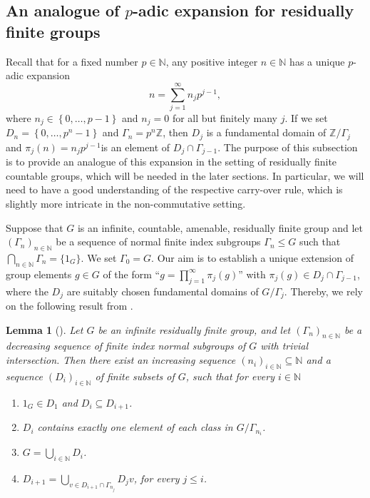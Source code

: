 \documentclass[titlepage,reqno,10pt]{amsart}
\newtheorem{lemma}[theorem]{Lemma}
\theoremstyle{definition}
\def\Z{{\mathbb Z}}
\def\N{{\mathbb N}}
\newcommand{\set}[1]{\left\{ #1 \right\}}
\begin{document}
\subsection{An analogue of $p$-adic expansion for residually finite groups} \label{subsect: expansion}
Recall that for a fixed number $p\in\N$, any positive integer $n\in\N$ has a unique $p$-adic expansion 
\begin{equation}\label{e.p-adic_expansion}
n = \sum_{j=1}^\infty n_jp^{j-1},
\end{equation} where $n_j \in \set{0,\ldots,p-1}$ and $n_j=0$ for all but finitely many $j$. If we set $D_n = \set{0,\ldots, p^n-1}$ and $\Gamma_n = p^n\Z$, then $D_j$ is a fundamental domain of $\Z/\Gamma_j$ and $\pi_j(n)=n_jp^{j-1}$is an element of $D_j \cap \Gamma_{j-1}$. The purpose of this subsection is to provide an analogue of this expansion in the setting of residually finite countable groups, which will be needed in the later sections. 
In particular, we will need to have a good understanding of the respective carry-over rule, which is slightly more intricate in the non-commutative setting. 
\medskip 

Suppose that $G$ is an infinite, countable, amenable, residually finite group and let $(\Gamma_n)_{n\in\N}$ be a sequence of normal finite index subgroups $\Gamma_n\leq G$ such that $\bigcap_{n\in\N} \Gamma_n = \{1_G\}$.
We set $\Gamma_0=G$. Our aim is to establish a unique extension of group elements $g\in G$ of the form  ``$g = \prod_{j=1}^\infty \pi_j(g)$'' with $\pi_j(g) \in D_j \cap \Gamma_{j-1}$, where the $D_j$ are suitably chosen fundamental domains of $G/\Gamma_j$. Thereby, we rely on the following result from \cite{CeCoGo23}. 


\begin{lemma}[{\cite[Lemma 2.9]{CeCoGo23}}]\label{lem: ex. of seq. of fundamental domains}
Let $G$ be an infinite residually finite group, and let $(\Gamma_n)_{n\in \mathbb{N}}$ be a   decreasing sequence of finite index normal subgroups of $G$ with trivial intersection.     Then there exist  an increasing sequence $(n_i)_{i\in \mathbb{N}}\subseteq \mathbb{N}$ and a sequence $(D_i)_{i\in \mathbb{N}}$  of finite subsets of $G$, such that for every $i\in \mathbb{N}$
\begin{enumerate}
    \item[$\mathrm{(D1)}$] $1_G\in D_1$ and $D_i\subseteq D_{i+1}$.
    \item[$\mathrm{(D2)}$] $D_i$ contains exactly one element of each class in $G/\Gamma_{n_i}$.
    \item[$\mathrm{(D3)}$] $G= \bigcup_{i\in \mathbb{N}} D_i$.
  \item[$\mathrm{(D4)}$] $D_{i+1}=\bigcup_{v\in D_{i+1}\cap \Gamma_{n_j}}D_jv$, for every $j\leq i$.  

  \end{enumerate}
  \end{lemma}
\end{document}
